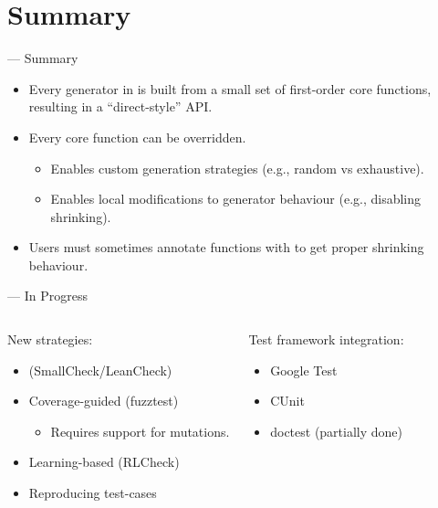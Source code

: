 \section{Summary}

\begin{frame}{\halcheck{} --- Summary}
  \begin{itemize}
    \item Every generator in \halcheck{} is built from a small set of first-order core functions, resulting in a ``direct-style'' API.
    \item Every core function can be overridden.
    \begin{itemize}
      \item Enables custom generation strategies (e.g., random vs exhaustive).
      \item Enables local modifications to generator behaviour (e.g., disabling shrinking).
    \end{itemize}
    \item Users must sometimes annotate functions with  to get proper shrinking behaviour.
  \end{itemize}
\end{frame}

\begin{frame}{\halcheck{} --- In Progress}
  \begin{columns}[T,onlytextwidth]
    \begin{block}{New strategies:}
      \begin{itemize}
        \item {} (SmallCheck/LeanCheck)
        \item Coverage-guided (fuzztest)
              \begin{itemize}
                \item Requires support for \alert{mutations}.
              \end{itemize}
        \item Learning-based (RLCheck)
        \item Reproducing test-cases
      \end{itemize}
    \end{block}

    \begin{block}{Test framework integration:}
      \begin{itemize}
        \item Google Test
        \item CUnit
        \item doctest (partially done)
      \end{itemize}
    \end{block}
  \end{columns}
\end{frame}
